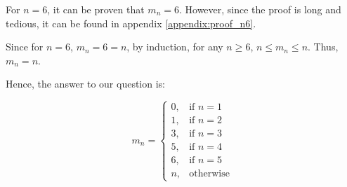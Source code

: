 \documentclass[a4paper, 12pt]{article}
\begin{document}
For $n=6$, it can be proven that $m_n=6$. However, since the proof is long and tedious, it can be found in appendix \ref{appendix:proof_n6}.






%     

Since for $n=6$, $m_n=6=n$, by induction, for any $n\geq6$, $n\leq m_n\leq n$. Thus, $m_n=n$.

Hence, the answer to our question is: 

\begin{equation}
m_n= 
\begin{cases}
    0,& \text{if } n=1\\
    1,& \text{if } n=2\\
    3,& \text{if } n=3\\
    5,& \text{if } n=4\\
    6,& \text{if } n=5\\
    n,& \text{otherwise}
\end{cases}
\end{equation}
\end{document}
